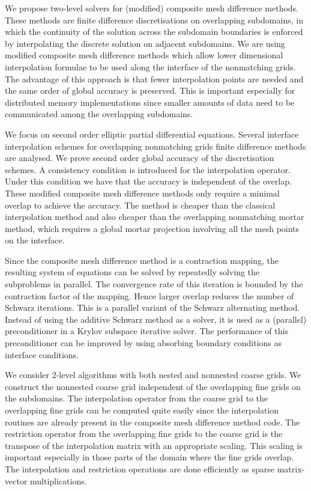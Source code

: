\documentclass[11pt]{article}
\begin{document}
We propose two-level solvers for (modified) composite mesh difference
methods.  These methods are finite difference discretisations on
overlapping subdomains, in which the continuity of the solution across the
subdomain boundaries is enforced by interpolating the discrete solution on
adjacent subdomains.  We are using modified composite mesh difference
methods which allow lower dimensional interpolation formulae to be used
along the interface of the nonmatching grids.  The advantage of this
approach is that fewer interpolation points are needed and the same order
of global accuracy is preserved.  This is important especially for
distributed memory implementations since smaller amounts of data need to be
communicated among the overlapping subdomains.

We focus on second order elliptic partial differential equations.  Several
interface interpolation schemes for overlapping nonmatching grids finite
difference methods are analysed.  We prove second order global accuracy of
the discretisation schemes.  A consistency condition is introduced for the
interpolation operator.  Under this condition we have that the accuracy is
independent of the overlap.  These modified composite mesh difference
methods only require a minimal overlap to achieve the accuracy.  The method
is cheaper than the classical interpolation method and also cheaper than
the overlapping nonmatching mortar method, which requires a global mortar
projection involving all the mesh points on the interface.

Since the composite mesh difference method is a contraction mapping, the
resulting system of equations can be solved by repeatedly solving the
subproblems in parallel.  The convergence rate of this iteration is bounded
by the contraction factor of the mapping.  Hence larger overlap reduces the
number of Schwarz iterations.  This is a parallel variant of the Schwarz
alternating method.  Instead of using the additive Schwarz method as a
solver, it is used as a (parallel) preconditioner in a Krylov subspace
iterative solver.  The performance of this preconditioner can be improved
by using absorbing boundary conditions as interface conditions.

We consider 2-level algorithms with both nested and nonnested coarse grids.
We construct the nonnested coarse grid independent of the overlapping fine
grids on the subdomains.  The interpolation operator from the coarse grid
to the overlapping fine grids can be computed quite easily since the
interpolation routines are already present in the composite mesh difference
method code.  The restriction operator from the overlapping fine grids to
the coarse grid is the transpose of the interpolation matrix with an
appropriate scaling.  This scaling is important especially in those parts
of the domain where the fine grids overlap.  The interpolation and
restriction operations are done efficiently as sparse matrix-vector
multiplications.
\end{document}

